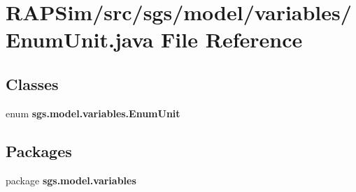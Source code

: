 \section{R\-A\-P\-Sim/src/sgs/model/variables/\-Enum\-Unit.java File Reference}
\label{_enum_unit_8java}
\subsection*{Classes}
\begin{DoxyCompactItemize}
\item 
enum {\bf sgs.\-model.\-variables.\-Enum\-Unit}
\end{DoxyCompactItemize}
\subsection*{Packages}
\begin{DoxyCompactItemize}
\item 
package {\bf sgs.\-model.\-variables}
\end{DoxyCompactItemize}
